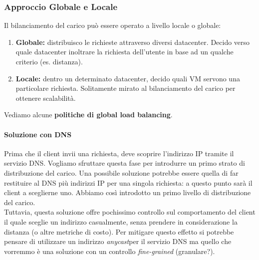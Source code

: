 \documentclass{article}
\begin{document}
\subsubsection{Approccio Globale e Locale}
Il bilanciamento del carico può essere operato a livello locale o globale:
\begin{enumerate}
    \item \textbf{Globale:} distribuisco le richieste attraverso diversi datacenter. Decido verso quale datacenter inoltrare la richiesta dell'utente in base ad un qualche criterio (es. distanza).
    \item \textbf{Locale:} dentro un determinato datacenter, decido quali VM servono una particolare richiesta. Solitamente mirato al bilanciamento del carico per ottenere scalabilità.
\end{enumerate}
Vediamo alcune \textbf{politiche di global load balancing}.
\paragraph{Soluzione con DNS}
Prima che il client invii una richiesta, deve scoprire l'indirizzo IP tramite il servizio DNS. Vogliamo sfruttare questa fase per introdurre un primo strato di distribuzione del carico. Una possibile soluzione potrebbe essere quella di far restituire al DNS più indirizzi IP per una singola richiesta: a questo punto sarà il client a sceglierne uno. Abbiamo così introdotto un primo livello di distribuzione del carico.\\
Tuttavia, questa soluzione offre pochissimo controllo sul comportamento del client il quale sceglie un indirizzo casualmente, senza prendere in considerazione la distanza (o altre metriche di costo). Per mitigare questo effetto si potrebbe pensare di utilizzare un indirizzo \textit{anycast}\footnotemark per il servizio DNS ma quello che vorremmo è una soluzione con un controllo \textit{fine-grained} (granulare?).
\end{document}
